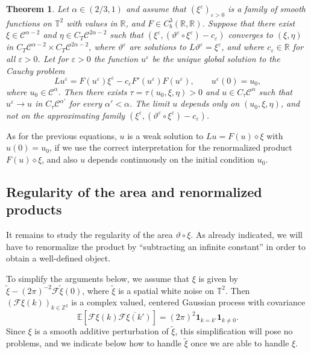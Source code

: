 \documentclass[11pt,a4paper]{article}
\newtheorem{theorem}{Theorem}
\theoremstyle{remark}
\newcommand{\Z}{\mathbb{Z}}
\newcommand{\E}{\mathbb{E}}
\newcommand{\CC}{\ensuremath{\mathscr{C}}}
\newcommand{\CF}{\ensuremath{\mathscr{F}}}
\begin{document}
\begin{theorem}\label{theorem:pam existence uniqueness}
  Let $\alpha \in ( 2/3,1 )$ and assume that $( \xi^{\varepsilon})_{\varepsilon >0}$ is a family of smooth functions on $\mathbb{T}^{2}$
  with values in $\mathbb{R}$, and $F \in C^{3}_{b} ( \mathbb{R},\mathbb{R})$. Suppose that there exist $\xi \in \CC^{\alpha -2}$ and $\eta \in C_{T} \CC^{2 \alpha -2}$ such that $( \xi^{\varepsilon} , (\vartheta^{\varepsilon} \circ   \xi^{\varepsilon} ) -c_{\varepsilon} )$
  converges to $( \xi , \eta )$ in $C_{T} \CC^{\alpha -2} \times C_{T} \CC^{2 \alpha -2}$, where $\vartheta^{\varepsilon}$ are solutions to $L \vartheta^{\varepsilon} = \xi^{\varepsilon}$, and where $c_{\varepsilon} \in \mathbb{R}$ for all $\varepsilon >0$.
  Let for $\varepsilon >0$ the function $u^{\varepsilon}$ be the unique global
  solution to the Cauchy problem
  \[
     L u^{\varepsilon} =F ( u^{\varepsilon} ) \xi^{\varepsilon} -c_{\varepsilon} F' ( u^{\varepsilon} ) F ( u^{\varepsilon} ) , \hspace{2em} u^{\varepsilon} ( 0 ) =u_{0},
  \]
  where $u_{0} \in \CC^{\alpha}$. Then there exists $\tau = \tau (u_{0} , \xi , \eta ) >0$ and $u \in C_{\tau} \CC^{\alpha}$ such that
  $u^{\varepsilon} \rightarrow u$ in $C_{\tau} \CC^{\alpha'}$ for
  every $\alpha' < \alpha$. The limit $u$ depends only on $( u_{0} , \xi , \eta )$, and not on the approximating family $( \xi^{\varepsilon} , (\vartheta^{\varepsilon} \circ   \xi^{\varepsilon} ) -c_{\varepsilon} )$.
\end{theorem}

As for the previous equations, $u$ is a weak solution to $L u=F ( u )\diamond \xi$ with $u ( 0 ) =u_{0}$, if we use the correct interpretation
for the renormalized product $F ( u ) \diamond\xi$, and also $u$ depends continuously on the initial condition $u_0$.








\subsection{Regularity of the area and renormalized products}

It remains to study the regularity of the area $\vartheta \circ \xi$. As already indicated, we will have to renormalize the product by ``subtracting an infinite constant'' in order to obtain a well-defined object.

To simplify the arguments below, we assume that $\xi$ is given by $\tilde{\xi} - (2\pi)^{-2} \CF \tilde{\xi}(0)$, where $\tilde{\xi}$ is a spatial white noise on $\mathbb{T}^2$. Then $(\CF \xi (k))_{k\in \Z^2}$ is a complex valued, centered Gaussian process with covariance
\[
   \E[\CF \xi (k) \overline{\CF \xi(k')}] = (2\pi)^2 \mathbf{1}_{k = k'} \mathbf{1}_{k\neq 0}.
\]
Since $\xi$ is a smooth additive perturbation of $\tilde{\xi}$, this simplification will pose no problems, and we indicate below how to handle $\tilde{\xi}$ once we are able to handle $\xi$.
\end{document}
